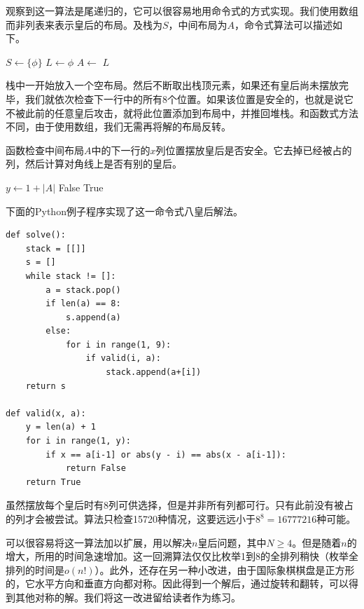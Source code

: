 \documentclass[UTF8]{article}
\begin{document}
观察到这一算法是尾递归的，它可以很容易地用命令式的方式实现。我们使用数组而非列表来表示皇后的布局。及栈为$S$，中间布局为$A$，命令式算法可以描述如下。

\begin{algorithmic}[1]
  \State $S \gets \{\phi\}$
  \State $L \gets \phi$ 
    \State $A \gets$  
      \State {}
    \Else
          \State {}
        \EndIf
      \EndFor
    \EndIf
  \EndWhile
  \State \Return $L$
\EndFunction
\end{algorithmic}

栈中一开始放入一个空布局。然后不断取出栈顶元素，如果还有皇后尚未摆放完毕，我们就依次检查下一行中的所有8个位置。如果该位置是安全的，也就是说它不被此前的任意皇后攻击，就将此位置添加到布局中，并推回堆栈。和函数式方法不同，由于使用数组，我们无需再将解的布局反转。

函数检查中间布局$A$中的下一行的$x$列位置摆放皇后是否安全。它去掉已经被占的列，然后计算对角线上是否有别的皇后。

\begin{algorithmic}[1]
  \State $y \gets 1 + |A|$
      \State \Return False
    \EndIf
  \EndFor
  \State \Return True
\EndFunction
\end{algorithmic}

下面的Python例子程序实现了这一命令式八皇后解法。

\lstset{language=Python}
\begin{lstlisting}
def solve():
    stack = [[]]
    s = []
    while stack != []:
        a = stack.pop()
        if len(a) == 8:
            s.append(a)
        else:
            for i in range(1, 9):
                if valid(i, a):
                    stack.append(a+[i])
    return s

def valid(x, a):
    y = len(a) + 1
    for i in range(1, y):
        if x == a[i-1] or abs(y - i) == abs(x - a[i-1]):
            return False
    return True
\end{lstlisting}

虽然摆放每个皇后时有8列可供选择，但是并非所有列都可行。只有此前没有被占的列才会被尝试。算法只检查15720种情况，这要远远小于$8^8 = 16777216$种可能\cite{wiki-8-queens}。

可以很容易将这一算法加以扩展，用以解决$n$皇后问题，其中$N \geq 4$。但是随着$n$的增大，所用的时间急速增加。这一回溯算法仅仅比枚举1到8的全排列稍快（枚举全排列的时间是$o(n!)$）。此外，还存在另一种小改进，由于国际象棋棋盘是正方形的，它水平方向和垂直方向都对称。因此得到一个解后，通过旋转和翻转，可以得到其他对称的解。我们将这一改进留给读者作为练习。
\end{document}
